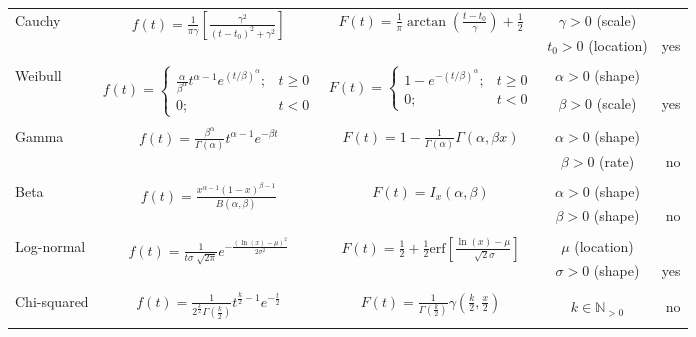 \begin{table}[t!]
{\begin{tabular}{lcccr}
\\ 
\multirow{2}{*}{Cauchy} & \multirow{2}{*}{ $f(t) = \frac{1}{\pi \gamma}[\frac{\gamma^2}{(t - t_{0})^{2} + \gamma^{2}}]$ } & \multirow{2}{*}{ $F(t) = \frac{1}{\pi}\arctan( \frac{t - t_{0}}{\gamma} ) + \frac{1}{2}  $ } &  $\gamma > 0$ (scale) \\ &  &   & $t_{0} > 0$ (location) & yes \\  
\\
\multirow{2}{*}{Weibull} & \multirow{2}{*}{ $f(t) = \begin{cases} \frac{\alpha}{\beta^\alpha}t^{\alpha - 1}e^{(t/\beta)^{\alpha}}; & t \geq 0 \\ 0; & t < 0 \end{cases}$  } & \multirow{2}{*}{ $F(t) = \begin{cases} 1 - e^{-(t/\beta)^{\alpha}}; & t \geq 0 \\ 0 ; & t < 0  \end{cases}$ } & $\alpha  > 0 $ (shape) \\ &  &  & $\beta > 0$ (scale)  & yes \\
\\
\multirow{2}{*}{Gamma} & \multirow{2}{*}{ $ f(t) = \frac{\beta^{\alpha}}{\Gamma(\alpha)}t^{\alpha - 1}e^{-\beta t}  $ } & \multirow{2}{*}{$ F(t) = 1 - \frac{1}{\Gamma(\alpha)}\Gamma(\alpha, \beta x) $} & $\alpha > 0$ (shape) \\ &  &  & $\beta > 0$ (rate) & no \\
\\ 
\multirow{2}{*}{Beta} & \multirow{2}{*}{ $ f(t) = \frac{x^{\alpha - 1}(1 - x)^{\beta - 1}}{B(\alpha, \beta)} $ } & \multirow{2}{*}{ $ F(t) = I_{x}(\alpha, \beta) $ } &  $\alpha > 0$ (shape) \\ &  &  & $\beta > 0$ (shape) & no \\ 
\\ 
\multirow{2}{*}{Log-normal} & \multirow{2}{*}{ $ f(t) = \frac{1}{t \sigma \sqrt[]{2 \pi}}e^{- \frac{(\ln(x) - \mu)^{2}}{2 \sigma^{2}}} $ } & \multirow{2}{*}{ $ F(t) = \frac{1}{2} + \frac{1}{2}\text{erf}[\frac{\ln(x) - \mu}{\sqrt[]{2} \sigma}] $ } & $\mu$ (location)\\
 &  &  & $ \sigma > 0 $ (shape) & yes \\ 
\\
\multirow{2}{*}{Chi-squared} & \multirow{2}{*}{ $ f(t) = \frac{1}{2^{\frac{k}{2}}\Gamma(\frac{k}{2}) }t^{\frac{k}{2} - 1}e^{-\frac{t}{2}} $ } & \multirow{2}{*}{ $ F(t) = \frac{1}{\Gamma(\frac{k}{2})}\gamma(\frac{k}{2}, \frac{x}{2}) $ } &  \\
 &  &  & $ k \in \mathbb{N}_{>0} $ &  no\\ 
\\
 
\hline
\end{tabular} 
} %
\end{table}

